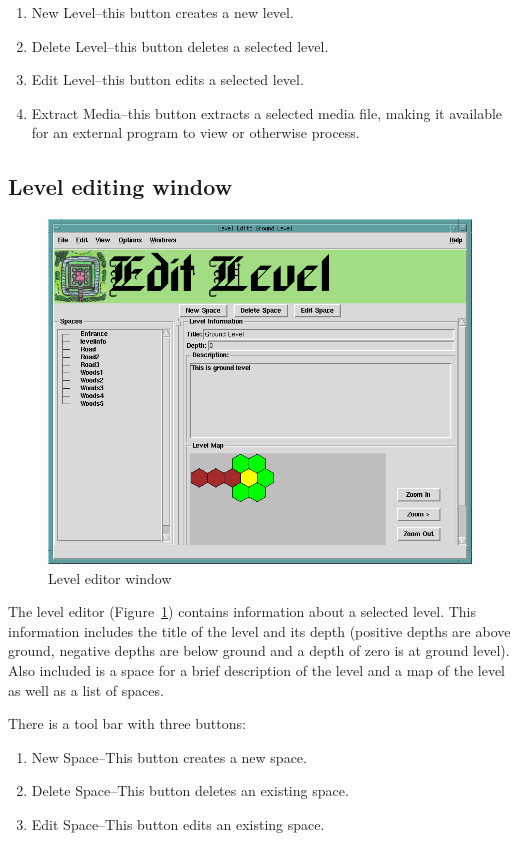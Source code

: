 \begin{enumerate}
\item New Level--this button creates a new level.
\item Delete Level--this button deletes a selected level.
\item Edit Level--this button edits a selected level.
\item Extract Media--this button extracts a selected media file, making
it available for an external program to view or otherwise process.
\end{enumerate}

\subsection{Level editing window}
\label{sect:leveledit}

\begin{figure}[hbpt] 
\begin{centering}
\includegraphics[width=5in]{LevelEditor.png}
\caption{Level editor window}
\label{fig:LevelEditor}
\end{centering}
\end{figure}
The level editor (Figure~\ref{fig:LevelEditor}) contains information
about a selected level.  This information includes the title of the
level and its depth (positive depths are above ground, negative depths are
below ground and a depth of zero is at ground level).  Also included is
a space for a brief description of the level and a map of the level as
well as a list of spaces.

There is a tool bar with three buttons:
\begin{enumerate}
\item New Space--This button creates a new space.
\item Delete Space--This button deletes an existing space.
\item Edit Space--This button edits an existing space.
\end{enumerate}

